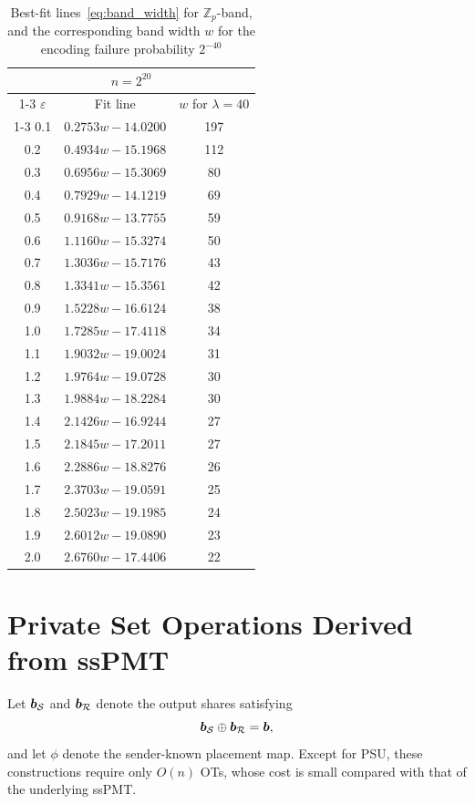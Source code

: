 \begin{table}[htbp]
\caption{Best-fit lines~\eqref{eq:band_width} for $\mathbb{Z}_p$-band, and the corresponding band width $w$ for the encoding failure probability $2^{-40}$}
\label{tab:our-best-fit-lines}
\centering
\small
\setlength{\tabcolsep}{20pt}
\renewcommand{\arraystretch}{1.15}
\begin{tabular}{ccc}
\toprule
\multicolumn{3}{c}{$n=2^{20}$} \\
\cmidrule(r){1-3} 
$\varepsilon$ & Fit line & $w$ for $\lambda = 40$ \\
\cmidrule(r){1-3}
 0.1 & $0.2753w - 14.0200$ & 197 \\
 0.2 & $0.4934w - 15.1968$ & 112 \\
 0.3 & $0.6956w - 15.3069$ & 80 \\
 0.4 & $0.7929w - 14.1219$ & 69 \\
 0.5 & $0.9168w - 13.7755$ & 59 \\
 0.6 & $1.1160w - 15.3274$ & 50 \\
 0.7 & $1.3036w - 15.7176$ & 43 \\
 0.8 & $1.3341w - 15.3561$ & 42 \\
 0.9 & $1.5228w - 16.6124$ & 38 \\
 1.0 & $1.7285w - 17.4118$ & 34 \\
 1.1 & $1.9032w - 19.0024$ & 31 \\
 1.2 & $1.9764w - 19.0728$ & 30 \\
 1.3 & $1.9884w - 18.2284$ & 30 \\
 1.4 & $2.1426w - 16.9244$ & 27 \\
 1.5 & $2.1845w - 17.2011$ & 27 \\
 1.6 & $2.2886w - 18.8276$ & 26 \\
 1.7 & $2.3703w - 19.0591$ & 25 \\
 1.8 & $2.5023w - 19.1985$ & 24 \\
 1.9 & $2.6012w - 19.0890$ & 23 \\
 2.0 & $2.6760w - 17.4406$ & 22 \\
\bottomrule
\end{tabular}
\end{table}

\section{Private Set Operations Derived from ssPMT} \label{app:pso}
Let \(\bm{b}_{\mathcal{S}}\) and \(\bm{b}_{\mathcal{R}}\) denote the output shares satisfying \[   \bm{b}_{\mathcal{S}}\oplus\bm{b}_{\mathcal{R}}=\bm{b}, \] and let \(\phi\) denote the sender-known placement map. Except for PSU, these constructions require only \(O(n)\) OTs, whose cost is small compared with that of the underlying ssPMT.  

